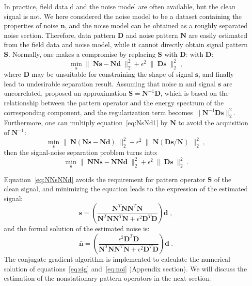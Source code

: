 In practice, field data d and the noise model are often available, but the
clean signal is not. We here considered the noise model to be a dataset
containing the properties of noise $\mathbf{n}$, and the noise model can
be obtained as a roughly separated noise section. Therefore, data pattern
$\mathbf{D}$ and noise pattern $\mathbf{N}$ are easily estimated from the field data
and noise model, while it cannot directly obtain signal pattern $\mathbf{S}$.
Normally, one makes a compromise by replacing $\mathbf{S}$ with $\mathbf{D}$:
with $\mathbf{D}$:
\begin{equation}
    \label{eq:NsNd1}
    \min_{\mathbf{s}} \| \; \mathbf{Ns} - \mathbf{Nd} \; \|_{2}^{2}
    + \epsilon^{2} \; \| \; \mathbf{Ds} \; \|_{2}^{2} \; ,
\end{equation}
where $\mathbf{D}$ may be unsuitable for constraining the shape of
signal $\mathbf{s}$, and finally lead to undesirable separation result.
Assuming that noise $\mathbf{n}$ and signal $\mathbf{s}$ are uncorrelated,
\cite{Spitz99} proposed an approximation $\mathbf{S} = \mathbf{N}^{-1}\mathbf{D}$,
which is based on the relationship between the pattern operator and the
energy spectrum of the corresponding component, and the regularization term
becomes $ \|\mathbf{N}^{-1}\mathbf{Ds}\|_{2}^{2} $. Furthermore, one can
multiply equation~\ref{eq:NsNd1} by $\mathbf{N}$ to avoid the acquisition
of $\mathbf{N}^{-1}$:
\begin{equation}
    \label{eq:NsNd2}
    \min_{\mathbf{s}} \| \; \mathbf{N} (\mathbf{Ns} - \mathbf{Nd}) \; \|_{2}^{2}
    + \epsilon^{2} \; \| \; \mathbf{N} (\mathbf{Ds} / \mathbf{N}) \; \|_{2}^{2} \; ,
\end{equation}
then the signal-noise separation problem turns into:
\begin{equation}
    \label{eq:NNsNNd}
    \min_{\mathbf{s}} \| \; \mathbf{NNs} - \mathbf{NNd} \; \|_{2}^{2}
    + \epsilon^{2} \; \| \; \mathbf{Ds} \; \|_{2}^{2} \; .
\end{equation}

Equation~\ref{eq:NNsNNd} avoids the requirement for pattern operator $\mathbf{S}$
of the clean signal, and minimizing the equation leads to the expression of
the estimated signal:
\begin{equation}
    \label{eq:sig}
    \mathbf{\bar{s}} =
    \left( \frac{\mathbf{N}^T \mathbf{N} \mathbf{N}^T \mathbf{N} }
    {\mathbf{N}^T \mathbf{N} \mathbf{N}^T \mathbf{N}
        + \epsilon^2 \mathbf{D}^T \mathbf{D}} \right) \mathbf{d} \;,
\end{equation}
and the formal solution of the estimated noise is:
\begin{equation}
    \label{eq:noi}
    \mathbf{\bar{n}} =
    \left( \frac{\epsilon^2 \mathbf{D}^T \mathbf{D}}
    {\mathbf{N}^T \mathbf{N} \mathbf{N}^T \mathbf{N}
        +\epsilon^2 \mathbf{D}^T \mathbf{D}} \right) \mathbf{d} \;.
\end{equation}
The conjugate gradient algorithm is implemented to calculate the numerical
solution of equations~\ref{eq:sig} and~\ref{eq:noi} (Appendix section).
We will discuss the estimation of the nonstationary pattern operators in
the next section.


